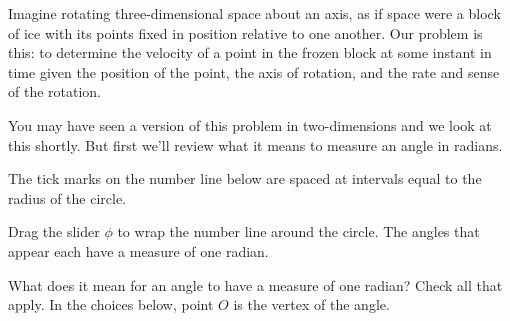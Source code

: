 \documentclass{ximera}
\begin{document}
Imagine rotating three-dimensional space about an axis, as if space were a block of ice with its points fixed in position relative to one another. Our problem is this: to determine the velocity of a point in the frozen block at some instant in time given the position of the point, the axis of rotation, and the rate and sense of the rotation.

 
\begin{onlineOnly}
    \begin{center}
\end{center}
\end{onlineOnly}





You may have seen a version of this problem in two-dimensions and we look at this shortly. But first we'll review what it means to measure an angle in radians.

\begin{exploration} \label{Esaghp:Cross}
The tick marks on the number line below are spaced at intervals equal to the radius of the circle.

Drag the slider $\phi$ to wrap the number line around the circle. The angles that appear each have a measure of one radian.

 
\begin{onlineOnly}
    \begin{center}
\end{center}
\end{onlineOnly}


\begin{question}   \label{Qsatd4th:Cross}
What does it mean for an angle to have a measure of one radian? Check all that apply. In the choices below, point $O$ is the vertex of the angle. 

\begin{selectAll}  
  \end{selectAll}  

\end{question}


\end{exploration}
\end{document}

